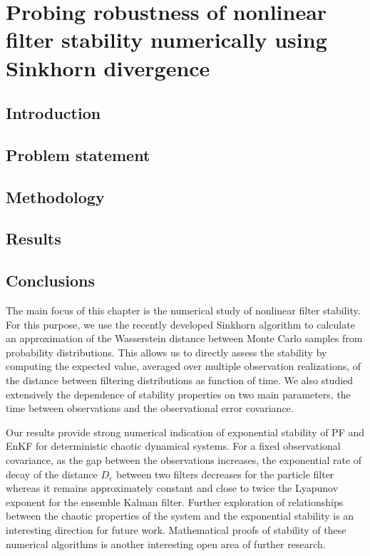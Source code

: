 \chapter{Probing robustness of nonlinear filter stability numerically using Sinkhorn divergence}
\section{Introduction}\label{sec-intro--probing-nfs}


\section{Problem statement}\label{sec-problem--probing-nfs}


\section{Methodology}\label{sec-method--probing-nfs}




\section{Results}\label{sec-results--probing-nfs}


\section{Conclusions}\label{sec-conclude--probing-nfs}

The main focus of this chapter is the numerical study of nonlinear filter stability. For this purpose, we use the recently developed Sinkhorn algorithm to calculate an approximation of the Wasserstein distance between Monte Carlo samples from probability distributions. This allows us to directly assess the stability by computing the expected value, averaged over multiple observation realizations, of the distance between filtering distributions as function of time. We also studied extensively the dependence of stability properties on two main parameters, the time between observations and the observational error covariance. 

Our results provide strong numerical indication of exponential stability of PF and EnKF for deterministic chaotic dynamical systems. For a fixed observational covariance, as the gap between the observations increases, the exponential rate of decay of the distance $D_\varepsilon$ between two filters decreases for the particle filter whereas it remains approximately constant and close to twice the Lyapunov exponent for the ensemble Kalman filter. {\color{mypink} Further exploration of relationships between the chaotic properties of the system and the exponential stability is an interesting direction for future work.} Mathematical proofs of stability of these numerical algorithms is another interesting open area of further research.

